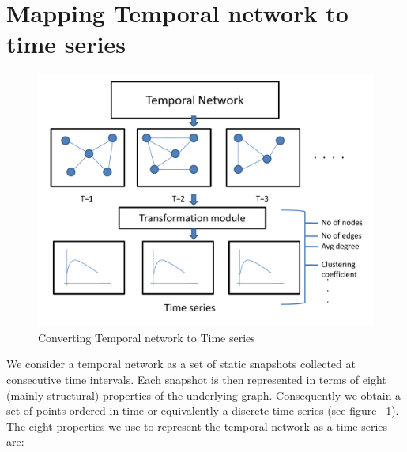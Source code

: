 \noindent
\section{Mapping Temporal network to time series}
\label{mapping}

\begin{figure}
 \begin{center}
 \includegraphics*[width=0.7\columnwidth, angle=0]{./texfiles/Chapter_1/fig/Presentation_d-eps-converted-to.pdf}
 \caption{\label{fig1}Converting Temporal network to Time series}
 \end{center}
 \end{figure}

 We consider a temporal network as a set of static snapshots collected at consecutive time intervals. 
Each snapshot is then represented in terms of eight (mainly structural) properties of the underlying graph. 
 Consequently we obtain a set of points ordered in time or equivalently a discrete time series (see figure ~\ref{fig1}). 
The eight properties we use to represent the temporal network as a time series are:
 

